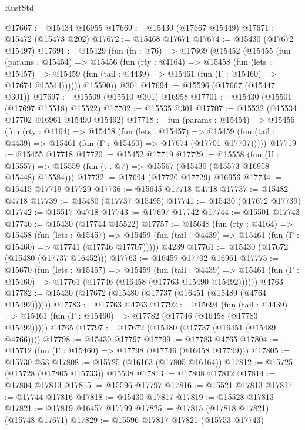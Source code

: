 \begin{lexlean}{RustStd}
\begin{coremodule}
{\begin{coremodule}
{{{{{{{{{{{{{{{{{{{{{{{{{{{{{{{{{{{{{{{{{{{{{{{{{{{{{{{{{{{{@17667 := @15434 @16955
@17669 := @15430 (@17667 @15449)
@17671 := @15472 (@15473 @202)
@17672 := @15468 @17671
@17674 := @15430 (@17672 @15497)
@17691 := @15429
    (fun (fn : @76) =>
    @17669
      (@15452
        (@15455
          (fun (params : @15454) =>
          @15456
            (fun (rty : @4164) =>
            @15458
              (fun (lets : @15457) =>
              @15459 (fun (tail : @4439) => @15461 (fun (Γ : @15460) => @17674 @15544))))))
        @15590))
    @301
@17694 := @15596 (@17667 (@15447 @301))
@17697 := @15509 (@15510 @301) @16958
@17701 := @15430 (@15501 (@17697 @15518) @15522)
@17702 := @15535 @301
@17707 := @15532 (@15534 @17702 @16961 @15490 @15492)
@17718 := fun (params : @15454) =>
  @15456
    (fun (rty : @4164) =>
    @15458
      (fun (lets : @15457) =>
      @15459 (fun (tail : @4439) => @15461 (fun (Γ : @15460) => @17674 (@17701 @17707)))))
@17719 := @15455 @17718
@17720 := @15452 @17719
@17729 := @15558
    (fun (U : @15557) => @15559 (fun (t : @7) => @15567 (@15430 (@15573 @16958 @15448) @15584)))
@17732 := @17694 (@17720 @17729) @16956
@17734 := @15415 @17719 @17729
@17736 := @15645 @17718 @4718
@17737 := @15482 @4718
@17739 := @15480 (@17737 @15495)
@17741 := @15430 (@17672 @17739)
@17742 := @15517 @4718
@17743 := @17697 @17742
@17744 := @15501 @17743
@17746 := @15430 (@17744 @15522)
@17757 := @15648
    (fun (rty : @4164) =>
    @15458
      (fun (lets : @15457) =>
      @15459 (fun (tail : @4439) => @15461 (fun (Γ : @15460) => @17741 (@17746 @17707)))))
    @4239
@17761 := @15430 (@17672 (@15480 (@17737 @16452)))
@17763 := @16459 @17702 @16961
@17775 := @15670
    (fun (lets : @15457) =>
    @15459
      (fun (tail : @4439) =>
      @15461 (fun (Γ : @15460) => @17761 (@17746 (@16458 (@17763 @15490 @15492))))))
    @4763
@17782 := @15430 (@17672 (@15480 (@17737 (@16451 (@15489 (@4764 @15492))))))
@17783 := @17763 @4763
@17792 := @15694
    (fun (tail : @4439) => @15461 (fun (Γ : @15460) => @17782 (@17746 (@16458 (@17783 @15492)))))
    @4765
@17797 := @17672 (@15480 (@17737 (@16451 (@15489 @4766))))
@17798 := @15430 @17797
@17799 := @17783 @4765
@17804 := @15712 (fun (Γ : @15460) => @17798 (@17746 (@16458 @17799)))
@17805 := @15730 @53
@17808 := @15725 (@16163 (@17805 @16164))
@17812 := @15725 (@15728 (@17805 @15733)) @15508
@17813 := @17808 @17812
@17814 := @17804 @17813
@17815 := @15596 @17797
@17816 := @15521 @17813
@17817 := @17744 @17816
@17818 := @15430 @17817
@17819 := @15528 @17813
@17821 := @17819 @16457 @17799
@17825 := @17815 (@17818 @17821) (@15748 @17671)
@17829 := @15596 @17817 @17821 (@15753 @17743)
}}}}}}}}}}}}}}}}}}}}}}}}}}}}}}}}}}}}}}}}}}}}}}}}}}}}}}}}}}}}
\end{coremodule}}
\end{coremodule}
\end{lexlean}
